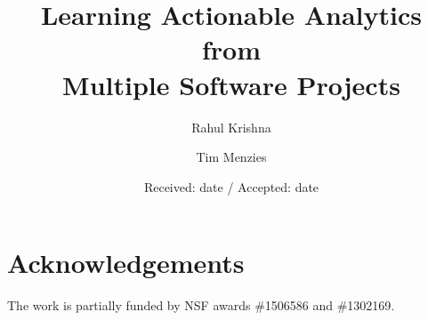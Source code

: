 \documentclass{svjour3} %
\begin{document}
\title{Learning Actionable Analytics from \\Multiple Software Projects}
\author{Rahul Krishna \and Tim Menzies}


\date{Received: date / Accepted: date}
\maketitle













\section*{Acknowledgements}
The work is partially funded by NSF awards \#1506586 and \#1302169.




\end{document}
